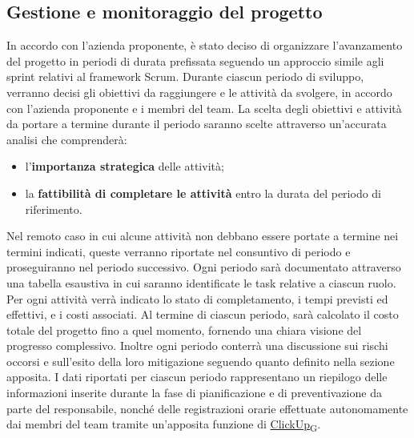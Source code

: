 \subsection{Gestione e monitoraggio del progetto}
In accordo con l'azienda proponente, è stato deciso di organizzare l’avanzamento del progetto in periodi di durata prefissata seguendo un approccio simile agli sprint relativi al framework Scrum.
Durante ciascun periodo di sviluppo, verranno decisi gli obiettivi da raggiungere e le attività da svolgere, in accordo con l'azienda proponente e i membri del team. La scelta degli obiettivi e attività da portare a termine durante il periodo saranno scelte attraverso un'accurata analisi che comprenderà:
\begin{itemize}
    \item l'\textbf{importanza strategica} delle attività;
    \item la \textbf{fattibilità di completare le attività} entro la durata del periodo di riferimento.
\end{itemize}
Nel remoto caso in cui alcune attività non debbano essere portate a termine nei termini indicati, queste verranno riportate nel consuntivo di periodo e proseguiranno nel periodo successivo. Ogni periodo sarà documentato attraverso una tabella esaustiva in cui saranno identificate le task relative a ciascun ruolo. Per ogni attività verrà indicato lo stato di completamento, i tempi previsti ed effettivi, e i costi associati. Al termine di ciascun periodo, sarà calcolato il costo totale del progetto fino a quel momento, fornendo una chiara visione del progresso complessivo.
Inoltre ogni periodo conterrà una discussione sui rischi occorsi e sull’esito della loro mitigazione seguendo quanto definito nella sezione apposita.
I dati riportati per ciascun periodo rappresentano un riepilogo delle informazioni inserite durante la fase di pianificazione e di preventivazione da parte del responsabile, nonché delle registrazioni orarie effettuate autonomamente dai membri del team tramite un'apposita funzione di \href{https://7last.github.io/docs/rtb/documentazione-interna/glossario#clickup}{ClickUp\textsubscript{G}}.


